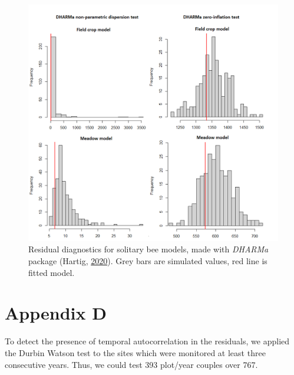\documentclass[smallextended]{svjour3}       %
\begin{document}
\begin{figure}[H]
\includegraphics[width=1\linewidth]{solitary_bees_files/figure-latex/residual-sb.png} \caption{Residual diagnostics for solitary bee models, made with \emph{DHARMa} package (Hartig, \protect\hyperlink{ref-dharma2020}{2020}). Grey bars are simulated values, red line is fitted model.}\label{fig:residualsdiag}
\end{figure}

\clearpage

\hypertarget{appendix-d}{%
\section{Appendix D}\label{appendix-d}}

To detect the presence of temporal autocorrelation in the residuals, we
applied the Durbin Watson test to the sites which were monitored at
least three consecutive years. Thus, we could test 393 plot/year couples
over 767.
\end{document}
